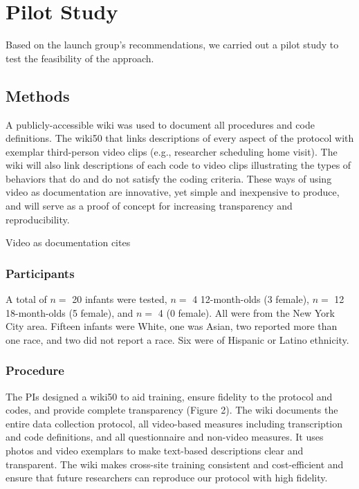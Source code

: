 \documentclass[english,man]{apa6}
\theoremstyle{definition}
\theoremstyle{definition}
\theoremstyle{definition}
\theoremstyle{remark}
\begin{document}
\section{Pilot Study}\label{pilot-study}

Based on the launch group's recommendations, we carried out a pilot
study to test the feasibility of the approach.

\subsection{Methods}\label{methods}

A publicly-accessible wiki \cite{PLAY-wiki} was used to document all
procedures and code definitions. The wiki50 that links descriptions of
every aspect of the protocol with exemplar third-person video clips
(e.g., researcher scheduling home visit). The wiki will also link
descriptions of each code to video clips illustrating the types of
behaviors that do and do not satisfy the coding criteria. These ways of
using video as documentation are innovative, yet simple and inexpensive
to produce, and will serve as a proof of concept for increasing
transparency and reproducibility.

Video as documentation cites

\subsubsection{Participants}\label{participants}

A total of \(n=\) 20 infants were tested, \(n=\) 4 12-month-olds (3
female), \(n=\) 12 18-month-olds (5 female), and \(n=\) 4 (0 female).
All were from the New York City area. Fifteen infants were White, one
was Asian, two reported more than one race, and two did not report a
race. Six were of Hispanic or Latino ethnicity.

\subsubsection{Procedure}\label{procedure}

The PIs designed a wiki50 to aid training, ensure fidelity to the
protocol and codes, and provide complete transparency (Figure 2). The
wiki documents the entire data collection protocol, all video-based
measures including transcription and code definitions, and all
questionnaire and non-video measures. It uses photos and video exemplars
to make text-based descriptions clear and transparent. The wiki makes
cross-site training consistent and cost-efficient and ensure that future
researchers can reproduce our protocol with high fidelity.
\end{document}

